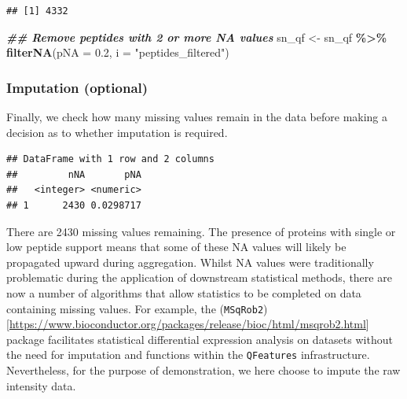 \documentclass[9pt,a4paper,]{extarticle}
\newenvironment{Shaded}{\begin{snugshade}}{\end{snugshade}}
\newcommand{\AttributeTok}[1]{\textcolor[rgb]{0.13,0.29,0.53}{#1}}
\newcommand{\DocumentationTok}[1]{\textcolor[rgb]{0.56,0.35,0.01}{\textbf{\textit{#1}}}}
\newcommand{\FloatTok}[1]{\textcolor[rgb]{0.00,0.00,0.81}{#1}}
\newcommand{\FunctionTok}[1]{\textcolor[rgb]{0.13,0.29,0.53}{\textbf{#1}}}
\newcommand{\NormalTok}[1]{#1}
\newcommand{\OtherTok}[1]{\textcolor[rgb]{0.56,0.35,0.01}{#1}}
\newcommand{\SpecialCharTok}[1]{\textcolor[rgb]{0.81,0.36,0.00}{\textbf{#1}}}
\newcommand{\StringTok}[1]{\textcolor[rgb]{0.31,0.60,0.02}{#1}}
\begin{document}
\begin{verbatim}
## [1] 4332
\end{verbatim}

\begin{Shaded}
\begin{Highlighting}[]
\DocumentationTok{\#\# Remove peptides with 2 or more NA values}
\NormalTok{sn\_qf }\OtherTok{\textless{}{-}}\NormalTok{ sn\_qf }\SpecialCharTok{\%\textgreater{}\%}
  \FunctionTok{filterNA}\NormalTok{(}\AttributeTok{pNA =} \FloatTok{0.2}\NormalTok{,}
           \AttributeTok{i =} \StringTok{"peptides\_filtered"}\NormalTok{)}
\end{Highlighting}
\end{Shaded}

\subsubsection{Imputation (optional)}\label{imputation-optional-1}

Finally, we check how many missing values remain in the data before making a
decision as to whether imputation is required.

\begin{Shaded}
\end{Shaded}

\begin{verbatim}
## DataFrame with 1 row and 2 columns
##         nNA       pNA
##   <integer> <numeric>
## 1      2430 0.0298717
\end{verbatim}

There are 2430 missing values remaining.
The presence of proteins with single or low peptide support means that some of
these NA values will likely be propagated upward during aggregation. Whilst NA
values were traditionally problematic during the application of downstream
statistical methods, there are now a number of algorithms that allow statistics
to be completed on data containing missing values. For example, the
(\texttt{MSqRob2}){[}\url{https://www.bioconductor.org/packages/release/bioc/html/msqrob2.html}{]}
\citetext{\citealp[\citet{Goeminne2020}]{Sticker2020}; \citealp{Goeminne2016}} package facilitates statistical
differential expression analysis on datasets without the need for imputation and
functions within the \texttt{QFeatures} infrastructure. Nevertheless, for the purpose of
demonstration, we here choose to impute the raw intensity data.
\end{document}
